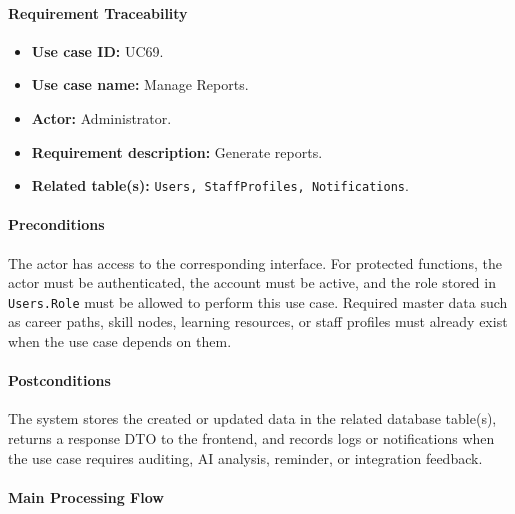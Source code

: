 \paragraph{Requirement Traceability}

\begin{itemize}
    \item \textbf{Use case ID:} UC69.
    \item \textbf{Use case name:} Manage Reports.
    \item \textbf{Actor:} Administrator.
    \item \textbf{Requirement description:} Generate reports.
    \item \textbf{Related table(s):} \texttt{Users, StaffProfiles, Notifications}.
\end{itemize}

\paragraph{Preconditions}

The actor has access to the corresponding interface. For protected functions, the actor must be authenticated, the account must be active, and the role stored in \texttt{Users.Role} must be allowed to perform this use case. Required master data such as career paths, skill nodes, learning resources, or staff profiles must already exist when the use case depends on them.

\paragraph{Postconditions}

The system stores the created or updated data in the related database table(s), returns a response DTO to the frontend, and records logs or notifications when the use case requires auditing, AI analysis, reminder, or integration feedback.

\paragraph{Main Processing Flow}

